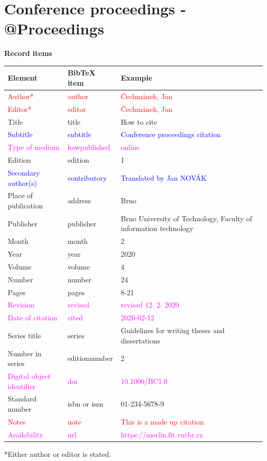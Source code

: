 \section*{Conference proceedings - @Proceedings}
\label{pr-sbornik}
\noindent \textbf{Record items}

\medskip

\begin{tabularx}{\linewidth}{X X X}
    Element & BibTeX item & Example\\\hline
    \textcolor{red}{Author*} & \textcolor{red}{author} & \textcolor{red}{Čechmánek, Jan}\\
    \textcolor{red}{Editor*} & \textcolor{red}{editor} & \textcolor{red}{Čechmánek, Jan}\\
    Title & title & How to cite\\
    \textcolor{blue}{Subtitle} & \textcolor{blue}{subtitle} & \textcolor{blue}{Conference proceedings citation}\\
    \textcolor{magenta}{Type of medium} & \textcolor{magenta}{howpublished} & \textcolor{magenta}{online}\\
    Edition & edition & 1\\
    \textcolor{blue}{Secondary author(s)} & \textcolor{blue}{contributory} & \textcolor{blue}{Translated by Jan NOVÁK}\\
    Place of publication & address & Brno\\
    Publisher & publisher & Brno University of Technology, Faculty of information technology\\
    Month & month & 2\\
    Year & year & 2020\\
    Volume & volume & 4\\
    Number & number & 24\\
    Pages & pages & 8-21\\
    \textcolor{magenta}{Revision} & \textcolor{magenta}{revised} & \textcolor{magenta}{revised 12. 2. 2020}\\
    \textcolor{magenta}{Date of citation} & \textcolor{magenta}{cited} & \textcolor{magenta}{2020-02-12}\\
    Series title & series & Guidelines for writing theses and dissertations\\
    Number in series & editionnumber & 2\\
    \textcolor{magenta}{Digital object identifier} & \textcolor{magenta}{doi} & \textcolor{magenta}{10.1000/BC1.0}\\
    Standard number & isbn or issn & 01-234-5678-9\\
    \textcolor{red}{Notes} & \textcolor{red}{note} & \textcolor{red}{This is a made up citation}\\
    \textcolor{magenta}{Availability} & \textcolor{magenta}{url} & \textcolor{magenta}{https://merlin.fit.vutbr.cz}
\end{tabularx}
*Either author or editor is stated.


